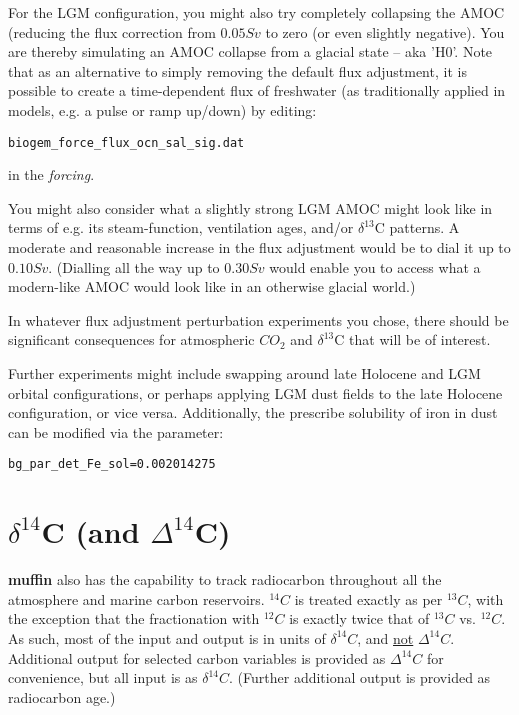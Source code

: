\documentclass[11pt,fleqn]{book} %
\begin{document}
For the LGM configuration, you might also try completely collapsing the AMOC (reducing the flux correction from \(0.05 Sv\) to zero (or even slightly negative). You are thereby simulating an AMOC collapse from a glacial state -- aka 'H0'. Note that as an alternative to simply removing the default flux adjustment, it is possible to create a time-dependent flux of freshwater (as traditionally applied in models, e.g. a pulse or ramp up/down) by editing:
\vspace{-2mm}\begin{verbatim}
biogem_force_flux_ocn_sal_sig.dat
\end{verbatim}\vspace{-2mm}
in the \textit{forcing}.

You might also consider what a slightly strong LGM AMOC might look like in terms of e.g. its steam-function, ventilation ages, and/or $\delta^{13}$C patterns. A moderate and reasonable increase in the flux adjustment would be to dial it up to \(0.10 Sv\). (Dialling all the way up to \(0.30 Sv\) would enable you to access what a modern-like AMOC would look like in an otherwise glacial world.)

In whatever flux adjustment perturbation experiments you chose, there should be significant consequences for  atmospheric \(CO_{2}\) and $\delta^{13}$C that will be of interest.

Further experiments might include swapping around late Holocene and LGM orbital configurations, or perhaps applying LGM dust fields to the late Holocene configuration, or vice versa. Additionally, the prescribe solubility of iron in dust can be modified via the parameter:
\vspace{-2mm}\begin{verbatim}
bg_par_det_Fe_sol=0.002014275
\end{verbatim}\vspace{-2mm}


\newpage


\section{$\delta^{14}$C (and $\Delta^{14}$C)}

\textbf{muffin} also has the capability to track radiocarbon throughout all the atmosphere and marine carbon reservoirs. \(^{14}C\) is treated exactly as per \(^{13}C\), with the exception that the fractionation with \(^{12}C\) is exactly twice that of \(^{13}C\) vs. \(^{12}C\). As such, most of the input and output is in units of \(\delta^{14}C\), and \uline{not} \(\Delta^{14}C\). Additional output for selected carbon variables is provided as \(\Delta^{14}C\) for convenience, but all input is as \(\delta^{14}C\). (Further additional output is provided as radiocarbon age.)
\end{document}
